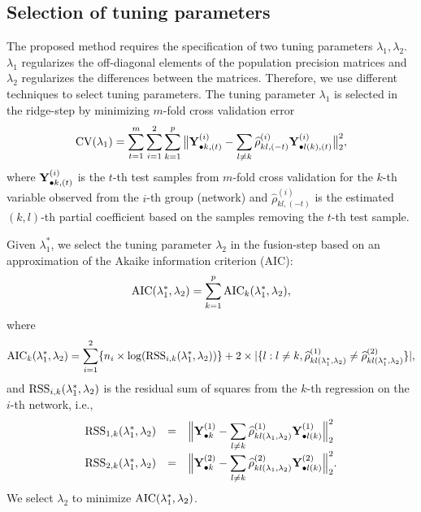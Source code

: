 \documentclass[useAMS,usenatbib,referee]{bio}
\begin{document}
{\subsection{Selection of tuning parameters}
The proposed method requires the specification of two tuning parameters $\lambda_1, \lambda_2$. $\lambda_1$ regularizes the off-diagonal elements of the population precision matrices and $\lambda_2$ regularizes the differences between the matrices.
Therefore, we use different techniques to select tuning parameters.
The tuning parameter $\lambda_1$ is selected in the ridge-step by minimizing $m$-fold cross validation error
\begin{equation}
{\rm CV}(\lambda_1) = \sum_{t=1}^m \sum_{i=1}^2 \sum_{k=1}^p 
\big\| {\bf Y}^{(i)}_{\bullet k,(t)} - \sum_{l \neq k} \widehat{\rho}^{(i)}_{kl,(-t)} {\bf Y}^{(i)}_{\bullet l(k),(t)} \big\|_2^2, 
\end{equation}
where ${\bf Y}^{(i)}_{\bullet k,(t)}$ is the $t$-th test samples from $m$-fold cross validation for the $k$-th variable observed from the $i$-th group (network) and $\widehat{\rho}^{(i)}_{kl,(-t)} $ is the estimated $(k,l)$-th partial coefficient based on the samples removing the $t$-th test sample. 


Given $\lambda_1^*$, we select the tuning parameter $\lambda_2$ in the fusion-step based on an approximation of the Akaike information criterion (AIC):
\begin{equation} \nonumber
{\rm AIC}(\lambda_1^*,\lambda_2)=\sum_{k=1}^{p} {\rm AIC}_k(\lambda_1^*,\lambda_2),
\end{equation}
where
\begin{equation}\label{AIC}
{\rm AIC}_k(\lambda_1^*,\lambda_2) = \sum_{i=1}^2 \{ n_i \times
\log({\rm RSS}_{i,k}(\lambda_1^*,\lambda_2)) \} + 2 \times |\{l: l \neq k
,\widehat{\rho}_{kl (\lambda_1^*,\lambda_2)}^{(1)}\neq \widehat{\rho}_{kl (\lambda_1^*,\lambda_2)}^{(2)}\}|,
\end{equation}
and ${\rm RSS}_{i,k}(\lambda_1^*,\lambda_2)$ is the residual sum of squares from the $k$-th regression on the $i$-th network, i.e.,
\begin{equation}\nonumber
\begin{array}{rcl} \displaystyle
{\rm RSS}_{1,k}(\lambda_1^*,\lambda_2) &=& \displaystyle\Big\| \mathbf{Y}^{(1)}_{\bullet k} -
\sum_{l \neq k}\widehat{\rho}_{kl(\lambda_1,\lambda_2)}^{(1)}
\mathbf{Y}_{\bullet l(k)}^{(1)} \Big\|_2^2 \\
{\rm RSS}_{2,k}(\lambda_1^*,\lambda_2) &=& \displaystyle\Big\| \mathbf{Y}_{\bullet k}^{(2)} -
\sum_{l \neq k} \widehat{\rho}_{kl (\lambda_1,\lambda_2)}^{(2)} \mathbf{Y}_{\bullet l(k)}^{(2)}
\Big\|_2^2.
\end{array}
\end{equation}
We select $\lambda_2$  to minimize ${\rm AIC}(\lambda_1^*,\lambda_2)$.


}
\end{document}
